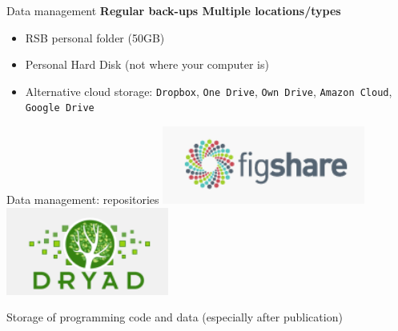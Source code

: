 \documentclass[10pt]{beamer}%
\begin{document}
\begin{frame}{Data management}
    \textbf{\large \alert{Regular back-ups} \hfill \alert{Multiple locations/types}}

\begin{itemize}
 \item  RSB personal folder (50GB)
    \item Personal Hard Disk (not where your computer is)
    \item Alternative cloud storage: \texttt{Dropbox}, \texttt{One Drive}, \texttt{Own Drive},  \texttt{Amazon Cloud}, \texttt{Google Drive}
\end{itemize}

\end{frame}


\begin{frame}{Data management: repositories}
\includegraphics[width=0.5\textwidth]{Figures/repo1}
\includegraphics[width=0.4\textwidth]{Figures/repo2}

\Large
Storage of programming code and data  (especially after publication)
\end{frame}
\end{document}

